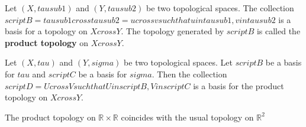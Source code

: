 \begin{defn}
    Let $(X, tau sub 1)$ and $(Y, tau sub 2)$ be two topological spaces. The collection $script B = tau sub 1 cross tau sub 2 = {{ u cross v such that u in tau sub 1, v in tau sub 2 }}$ is a basis for a topology on $X cross Y$.
    The topology generated by $script B$ is called the \textbf{product topology} on $X cross Y$.
\end{defn}

\begin{thm}
    Let $(X, tau)$ and $(Y, sigma)$ be two topological spaces. Let $script B$ be a basis for $tau$ and $script C$ be a basis for $sigma$.
    Then the collection $script D = {{ U cross V such that U in script B, V in script C }}$ is a basis for the product topology on $X cross Y$.
\end{thm}

\begin{result}
    The product topology on $\mathbb{R} \times \mathbb{R}$ coincides with the usual topology on $\mathbb{R}^2$
\end{result}

\hhrule
